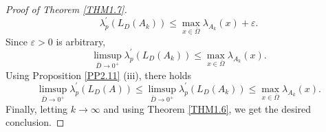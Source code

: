 \documentclass[11pt,reqno]{amsart}
\numberwithin{equation}{section}
\begin{document}
\begin{proof}[Proof of Theorem \ref{THM1.7}]
\begin{equation*}
\lambda_{p}^{\prime}(L_{D}(A_{k}))
\leq
\max_{x\in\bar{\Omega}}\lambda_{A_{k}}(x) + \varepsilon.
\end{equation*}
Since $\varepsilon>0$ is arbitrary,
\begin{equation*}
\limsup_{\bar{D} \to 0^{+}} \lambda_{p}^{\prime}(L_{D}(A_{k})) \leq \max_{x \in \bar{\Omega}} \lambda_{A_{k}}(x).
\end{equation*}
Using Proposition \ref{PP2.11} (iii), there holds
\begin{equation*}
\limsup_{\bar{D} \to 0^{+}} \lambda_{p}^{\prime}(L_{D}(A))
\leq
\limsup_{\bar{D} \to 0^{+}} \lambda_{p}^{\prime}(L_{D}(A_{k}))
\leq \max_{x \in \bar{\Omega}} \lambda_{A_{k}}(x).
\end{equation*}
Finally, letting $k \to \infty$ and using Theorem \ref{THM1.6}, we get the desired conclusion.









\end{proof}
\end{document}

